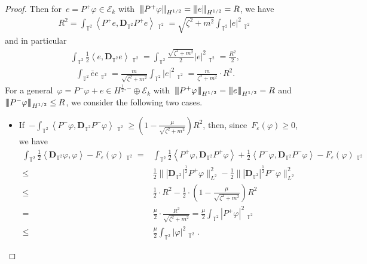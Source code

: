 \documentclass[11pt,final]{amsart}
\newcommand{\tnorm}[1]{%
  \left\vert\kern-0.3ex\left\vert\kern-0.3ex\left\vert #1 \right\vert\kern-0.3ex\right\vert\kern-0.3ex\right\vert
}
\newcommand{\T}{\mathbb{T}}
\newcommand{\dd}{\mathop{}\!\mathrm{d}}
\newcommand{\eps}{\varepsilon}
\newcommand{\pD}{\mathbf{D}}
\newcommand{\Abracket}[1]{\left<#1\right>} %
\DeclareMathOperator{\dv}{\dd{vol}}
\begin{document}
\begin{proof}
Then for~$e=P^+\varphi\in\mathscr{E}_k$ with~$\tnorm{P^+\varphi}_{H^{1/2}} = \tnorm{e}_{H^{1/2}}=R$, we have
\begin{align}
    R^2
    =\int_{\T^2} \Abracket{P^+e,\pD_{\T^2} P^+ e}\dv_{\T^2} = \sqrt{\zeta^2+m^2} \int_{\T^2} |e|^2\dv_{\T^2}
\end{align}
and in particular
\begin{align}
    \int_{\T^2} \frac{1}{2}\Abracket{e,\pD_{\T^2} e}\dv_{\T^2}
    = \int_{\T^2} \frac{\sqrt{\zeta^2+m^2} }{2} |e|^2 \dv_{\T^2}
    = \frac{R^2}{2},
\end{align}
\begin{align}
    \int_{\T^2} \bar{e}e\dv_{\T^2} = \frac{m}{\sqrt{\zeta^2 + m^2}} \int_{\T^2} |e|^2 \dv_{\T^2}
    = \frac{m}{{\zeta^2 + m^2}}\cdot R^2.
\end{align}
For a general~$\varphi=P^-\varphi+e\in H^{\frac{1}{2},-}\oplus\mathscr{E}_k$ with~$\tnorm{P^+\varphi}_{H^{1/2}}=\tnorm{e}_{H^{1/2}}=R$ and~$\tnorm{P^-\varphi}_{H^{1/2}}\leq R$, we consider the following two cases.
\begin{itemize}
    \item If~$-\int_{\T^2}\Abracket{P^-\varphi,\pD_{\T^2} P^-\varphi}\dv_{\T^2}\geq(1-\frac{\mu}{\sqrt{\zeta^2+m^2}})R^2$, then, since~$F_\eps(\varphi)\geq 0$, we have
    \begin{align}
        \int_{\T^2} \frac{1}{2}\Abracket{\pD_{\T^2}\varphi,\varphi}-F_\eps(\varphi) \dv_{\T^2}
        =& \int_{\T^2} \frac{1}{2}\Abracket{P^+\varphi,\pD_{\T^2} P^+\varphi} +\frac{1}{2} \Abracket{P^-\varphi,\pD_{\T^2} P^-\varphi} -F_\eps(\varphi) \dv_{\T^2} \\
         \leq&          \frac{1}{2}\||\pD_{\T^2}|^{\frac12}P^+\varphi\|^2_{L^2} - \frac{1}{2}\||\pD_{\T^2}|^{\frac12}P^-\varphi\|^2_{L^2} \\
        \leq & \frac{1}{2}\cdot R^2 - \frac{1}{2}\cdot(1-\frac{\mu}{\sqrt{\zeta^2+m^2}})R^2\\
        = & \frac{\mu}{2}\cdot\frac{R^2}{\sqrt{\zeta^2+m^2}}  = \frac{\mu}{2}\int_{\T^2} |P^+ \varphi|^2 \dv_{\T^2}  \\
        \leq& \frac{\mu}{2}\int_{\T^2} |\varphi|^2\dv_{\T^2}.
    \end{align}


\end{itemize}
\end{proof}
\end{document}
